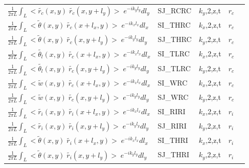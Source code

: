 \begin{center}
\begin{makeimage}
\begin{tabular}{||p{6cm}|>{\centering}p{2.5cm}|>{\centering}p{1.5cm}|>{\centering}p{0.5cm}|p{5cm }||}
\cline{1-4}
$\frac{1}{2\pi L}\int_L<\tilde{r_c}(x,y)\;\tilde{r_c}(x,y+l_y)>\;e^{-ik_yl_y}dl_y$ & SJ\_RCRC & $k_y$,2,z,t & $r_c$ & \\
\cline{1-4}
$\frac{1}{2\pi L}\int_L<\tilde{\theta}(x,y)\;\tilde{r_c}(x+l_x,y)>\;e^{-ik_xl_x}dl_x$ & SI\_THRC & $k_x$,2,z,t & $r_c$ & \\
\cline{1-4}
$\frac{1}{2\pi L}\int_L<\tilde{\theta}(x,y)\;\tilde{r_c}(x,y+l_y)>\;e^{-ik_yl_y}dl_y$ & SJ\_THRC & $k_y$,2,z,t & $r_c$ & \\
\cline{1-4}
$\frac{1}{2\pi L}\int_L<\tilde{\theta_l}(x,y)\;\tilde{r_c}(x+l_x,y)>\;e^{-ik_xl_x}dl_x$ & SI\_TLRC & $k_x$,2,z,t & $r_c$ & \\
\cline{1-4}
$\frac{1}{2\pi L}\int_L<\tilde{\theta_l}(x,y)\;\tilde{r_c}(x,y+l_y)>\;e^{-ik_yl_y}dl_y$ & SJ\_TLRC & $k_y$,2,z,t & $r_c$ & \\
\cline{1-4}
$\frac{1}{2\pi L}\int_L<\tilde{w}(x,y)\;\tilde{r_c}(x+l_x,y)>\;e^{-ik_xl_x}dl_x$ & SI\_WRC & $k_x$,2,z,t & $r_c$ & \\
\cline{1-4}
$\frac{1}{2\pi L}\int_L<\tilde{w}(x,y)\;\tilde{r_c}(x,y+l_y)>\;e^{-ik_yl_y}dl_y$ & SJ\_WRC & $k_y$,2,z,t & $r_c$ & \\
\cline{1-4}
$\frac{1}{2\pi L}\int_L<\tilde{r_i}(x,y)\;\tilde{r_i}(x+l_x,y)>\;e^{-ik_xl_x}dl_x$ & SI\_RIRI & $k_x$,2,z,t & $r_i$ & \\
\cline{1-4}
$\frac{1}{2\pi L}\int_L<\tilde{r_i}(x,y)\;\tilde{r_i}(x,y+l_y)>\;e^{-ik_yl_y}dl_y$ & SJ\_RIRI & $k_y$,2,z,t & $r_i$ & \\
\cline{1-4}
$\frac{1}{2\pi L}\int_L<\tilde{\theta}(x,y)\;\tilde{r_i}(x+l_x,y)>\;e^{-ik_xl_x}dl_x$ & SI\_THRI & $k_x$,2,z,t & $r_i$ & \\
\cline{1-4}
$\frac{1}{2\pi L}\int_L<\tilde{\theta}(x,y)\;\tilde{r_i}(x,y+l_y)>\;e^{-ik_yl_y}dl_y$ & SJ\_THRI & $k_y$,2,z,t & $r_i$ & \\
\hline
\hline
\end{tabular}
\end{makeimage}
\end{center}

